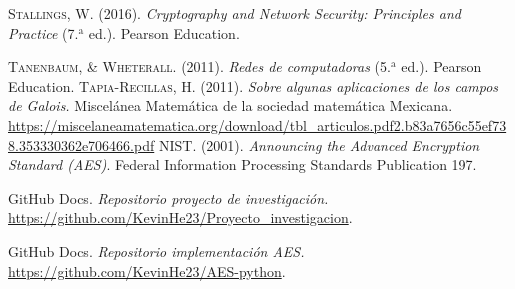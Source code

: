 \documentclass[peerreview]{IEEEtran}
\begin{document}
\begin{thebibliography}{1}
   \textsc{Stallings, W.} (2016). \textit{Cryptography and Network
    Security: Principles and Practice} (7.$^{\text{a}}$ ed.). Pearson Education.

   \textsc{Tanenbaum, \& Wheterall.} (2011). \textit{Redes de
    computadoras} (5.$^{\text{a}}$ ed.). Pearson Education.
  \textsc{Tapia-Recillas, H.} (2011). \textit{Sobre algunas
    aplicaciones de los campos de Galois.} Miscelánea Matemática de la sociedad
  matemática Mexicana.
  \url{https://miscelaneamatematica.org/download/tbl_articulos.pdf2.b83a7656c55ef738.353330362e706466.pdf}
   \textsc{NIST}. (2001). \textit{Announcing the Advanced
    Encryption Standard (AES)}. Federal Information Processing Standards Publication
  197.

   GitHub Docs.\textit{ Repositorio proyecto de
    investigación.} \url{https://github.com/KevinHe23/Proyecto_investigacion}.

   GitHub Docs.\textit{ Repositorio implementación AES.}
  \url{https://github.com/KevinHe23/AES-python}.
\end{thebibliography}
\end{document}

